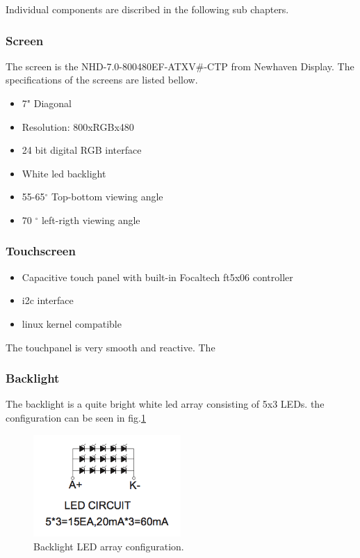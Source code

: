  Individual components are discribed in the following sub chapters.

\subsubsection{Screen}
The screen is the NHD-7.0-800480EF-ATXV\#-CTP from Newhaven Display. The specifications of the screens are listed bellow.
\begin{itemize}
  \item {7" Diagonal}
  \item{Resolution: 800xRGBx480}
  \item{24 bit digital RGB interface}
  \item{White led backlight}
  \item{55-65$^{\circ}$ Top-bottom viewing angle }
  \item{70 $^{\circ}$ left-rigth viewing angle}
\end{itemize}


\subsubsection{Touchscreen}

\begin{itemize}
  \item {Capacitive touch panel with built-in Focaltech ft5x06 controller}
  \item {i2c interface}
  \item {linux kernel compatible}
\end{itemize}
The touchpanel is very smooth and reactive. The
\subsubsection{Backlight}
\label{chap: backlight}
The backlight is a quite bright white led array consisting of 5x3 LEDs. the configuration can be seen in fig.\ref{fig:backlight_led}

\begin{figure}[!htb]
    \centering
    \includegraphics[width=0.5\textwidth,keepaspectratio]{chap/hardFig/backlight_led_circuit}
    \caption{Backlight LED array configuration.}
    \label{fig:backlight_led}
\end{figure}

